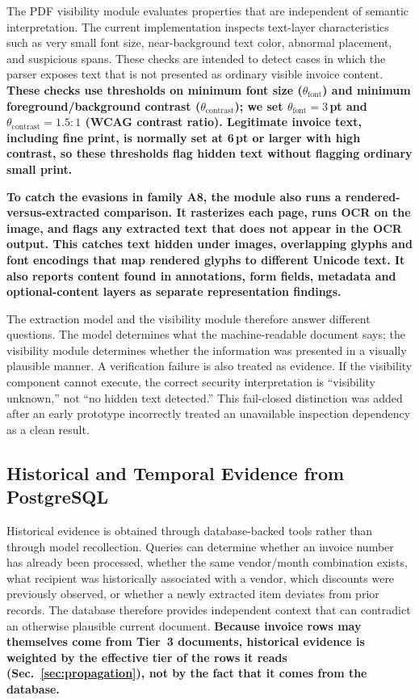 \documentclass[conference]{IEEEtran}
\newenvironment{added}{\bfseries}{}
\newcommand{\addtext}[1]{\textbf{#1}}
\begin{document}
The PDF visibility module evaluates properties that are independent of
semantic interpretation. The current implementation inspects text-layer
characteristics such as very small font size, near-background text color,
abnormal placement, and suspicious spans. These checks are intended to
detect cases in which the parser exposes text that is not presented as
ordinary visible invoice content. \addtext{These checks use thresholds on minimum font size ($\theta_{\mathrm{font}}$) and minimum foreground/background contrast ($\theta_{\mathrm{contrast}}$); we set $\theta_{\mathrm{font}} = 3$\,pt and $\theta_{\mathrm{contrast}} = 1.5{:}1$ (WCAG contrast ratio). Legitimate invoice text, including fine print, is normally set at 6\,pt or larger with high contrast, so these thresholds flag hidden text without flagging ordinary small print.}

\begin{added}
To catch the evasions in family A8, the module also runs a rendered-versus-extracted comparison. It rasterizes each page, runs OCR on the image, and flags any extracted text that does not appear in the OCR output. This catches text hidden under images, overlapping glyphs and font encodings that map rendered glyphs to different Unicode text. It also reports content found in annotations, form fields, metadata and optional-content layers as separate representation findings.
\end{added}

The extraction model and the visibility module therefore answer different
questions. The model determines what the machine-readable document says;
the visibility module determines whether the information was presented in a
visually plausible manner. A verification failure is also treated as
evidence. If the visibility component cannot execute, the correct security
interpretation is ``visibility unknown,'' not ``no hidden text detected.''
This fail-closed distinction was added after an early prototype incorrectly
treated an unavailable inspection dependency as a clean result.


\subsection{Historical and Temporal Evidence from PostgreSQL}

Historical evidence is obtained through database-backed tools rather than
through model recollection. Queries can determine whether an invoice number
has already been processed, whether the same vendor/month combination exists,
what recipient was historically associated with a vendor, which discounts
were previously observed, or whether a newly extracted item deviates from
prior records. The database therefore provides independent context that can
contradict an otherwise plausible current document. \addtext{Because invoice rows may themselves come from Tier~3 documents, historical evidence is weighted by the effective tier of the rows it reads (Sec.~\ref{sec:propagation}), not by the fact that it comes from the database.}
\end{document}
